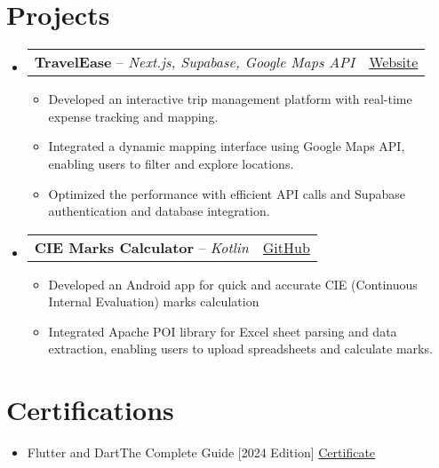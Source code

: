 \documentclass[a4paper,12pt]{article}
\makeatletter
\newcommand{\resumeItem}[1]{
  \item\small{
    {#1}\vspace{-2pt}
  }
}
\newcommand{\expSubheading}[3]{
  \vspace{-1pt}\item
    \begin{tabular*}{0.97\textwidth}{l@{\extracolsep{\fill}}r}
      \textbf{#1} -- \textit{#2} & #3 \\
    \end{tabular*}\vspace{-5pt}
}
\newcommand{\resumeSubHeadingListStart}{\begin{itemize}[leftmargin=*]}
\newcommand{\resumeSubHeadingListEnd}{\end{itemize}}
\newcommand{\resumeItemListStart}{\begin{itemize}}
\newcommand{\resumeItemListEnd}{\end{itemize}\vspace{-5pt}}
\makeatother
\begin{document}

\section{Projects}
\resumeSubHeadingListStart

\expSubheading
{TravelEase}{Next.js, Supabase, Google Maps API}{\href{http://travel-ease-mocha.vercel.app}{Website}}
\resumeItemListStart
\resumeItem
{Developed an interactive trip management platform with real-time expense tracking and mapping.}
\resumeItem
{Integrated a dynamic mapping interface using Google Maps API, enabling users to filter and explore locations.}
\resumeItem
{Optimized the performance with efficient API calls and Supabase authentication and database integration.}
\resumeItemListEnd


\expSubheading
{CIE Marks Calculator}{Kotlin}{\href{http://nammalakes.github.io/dashboard}{GitHub}}
\resumeItemListStart
\resumeItem
{Developed an Android app for quick and accurate CIE (Continuous Internal Evaluation) marks calculation}
\resumeItem
{Integrated Apache POI library for Excel sheet parsing and data extraction, enabling users to upload spreadsheets and calculate marks.}
\resumeItemListEnd

\resumeSubHeadingListEnd


\section{Certifications}
\resumeSubHeadingListStart
\resumeItem
{Flutter and Dart\textendash The Complete Guide [2024 Edition]}{\hfill\href{https://www.udemy.com/certificate/UC-f97e04ad-6a49-41bc-9788-bf93ee049e9e/}{Certificate}}
\resumeSubHeadingListEnd
\end{document}
